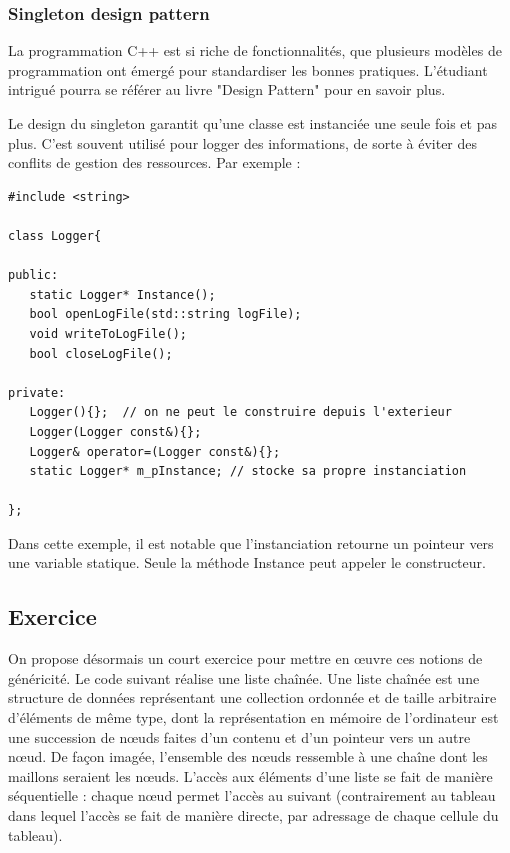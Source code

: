 \documentclass[conference]{IEEEtran}
\begin{document}
\subsubsection{Singleton design pattern}

La programmation C++ est si riche de fonctionnalités, que plusieurs modèles de programmation ont émergé pour standardiser les bonnes pratiques.
L'étudiant intrigué pourra se référer au livre "Design Pattern" \cite{gamma1995design} pour en savoir plus.

Le design du singleton garantit qu'une classe est instanciée une seule fois et pas plus. C'est souvent utilisé pour logger des informations, de sorte à éviter des conflits de gestion des ressources. Par exemple :



\begin{lstlisting}
#include <string>

class Logger{

public:
   static Logger* Instance();
   bool openLogFile(std::string logFile);
   void writeToLogFile();
   bool closeLogFile();

private:
   Logger(){};  // on ne peut le construire depuis l'exterieur
   Logger(Logger const&){};
   Logger& operator=(Logger const&){};
   static Logger* m_pInstance; // stocke sa propre instanciation

};
\end{lstlisting}
Dans cette exemple, il est notable que l'instanciation retourne un pointeur vers une variable statique. Seule la méthode Instance peut appeler le constructeur.




\subsection{Exercice}

On propose désormais un court exercice pour mettre en œuvre ces notions de généricité.
Le code suivant réalise une liste chaînée.
Une liste chaînée est une structure de données représentant une collection ordonnée et de taille arbitraire d'éléments de même type, dont la représentation en mémoire de l'ordinateur est une succession de nœuds faites d'un contenu et d'un pointeur vers un autre nœud.
De façon imagée, l'ensemble des nœuds ressemble à une chaîne dont les maillons seraient les nœuds.
L'accès aux éléments d'une liste se fait de manière séquentielle : chaque nœud permet l'accès au suivant (contrairement au tableau dans lequel l'accès se fait de manière directe, par adressage de chaque cellule du tableau).
\end{document}
